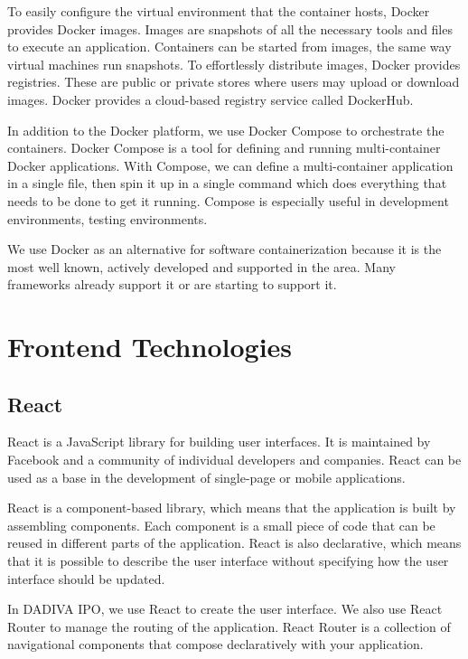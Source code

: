 To easily configure the virtual environment that the container hosts, Docker provides Docker images. Images are snapshots of all the necessary tools and files to execute an application. 
Containers can be started from images, the same way virtual machines run snapshots. To effortlessly distribute images, Docker provides registries. These are public or private stores where users may upload or download images. Docker provides a cloud-based registry service called DockerHub.

In addition to the Docker platform, we use Docker Compose to orchestrate the containers. Docker Compose is a tool for defining and running multi-container Docker applications. With Compose, we can define a multi-container application in a single file, then spin it up in a single command which does everything that needs to be done to get it running. Compose is especially useful in development environments, testing environments. 

We use Docker as an alternative for software containerization because it is the most well known, actively developed and supported in the area. Many frameworks already support it or are starting to support it.

\section{Frontend Technologies}\label{sec:frontend_tech}

\subsection{React}

React is a JavaScript library for building user interfaces. It is maintained by Facebook and a community of individual developers and companies. React can be used as a base in the development of single-page or mobile applications.

React is a component-based library, which means that the application is built by assembling components. Each component is a small piece of code that can be reused in different parts of the application. React is also declarative, which means that it is possible to describe the user interface without specifying how the user interface should be updated.

In DADIVA IPO, we use React to create the user interface. We also use React Router to manage the routing of the application. React Router is a collection of navigational components that compose declaratively with your application.

